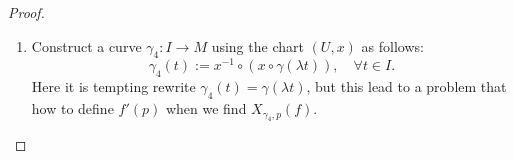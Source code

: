 \begin{proof}
\begin{enumerate}
		      Now, for all \(f \in \SC^\infty(M)\),
		      \begin{align*}
			      X_{\gamma_3, p}(f) & = (f \circ \gamma_3)'(0)                                                                                                                  \\
			                         & = \qty(f \circ x^{-1} \circ (x \circ \gamma_1 + x \circ \gamma_2 - x(p)))'(0)                                                             \\
			      \intertext{map \(f \circ x^{-1}: x(U) \subseteq \R^d \to \R\), and \(x \circ \gamma_1 + x \circ \gamma_2 - x(p): I \subseteq \R \to \R^d\), so we can apply the multivariate chain rule, taking derivative in \(j\)-th coordinate direction, \(j = 1, \ldots, d\):}
			                         & = \qty[\partial_j (f \circ x^{-1})(x(p))] \cdot \qty(x^j \circ \gamma_1 + x^j \circ \gamma_2 - x^j(p))'(0)                                \\
			      \shortintertext{where \(x^j\) is the \(j\)-th coordinate function of chart \(x\). Here sum over \(j\) from \(1\) to \(d\) is implied. Using linearity of the usual derivative, we have:}
			                         & = \qty[\partial_j (f \circ x^{-1})(x(p))] \cdot \qty((x^j \circ \gamma_1)'(0) + (x^j \circ \gamma_2)'(0))                                 \\
			                         & = [\partial_j (f \circ x^{-1})(x(p)) \cdot (x^j \circ \gamma_1)'(0)] + [\partial_j (f \circ x^{-1})(x(p)) \cdot (x^j \circ \gamma_2)'(0)] \\
			      \shortintertext{combining the term in the square brackets, we get:}
			                         & = (f \circ \gamma_1)'(0) + (f \circ \gamma_2)'(0)                                                                                         \\
			                         & = X_{\gamma_1, p}(f) + X_{\gamma_2, p}(f)                                                                                                 \\
			                         & = (X_{\gamma_1, p} \oplus X_{\gamma_2, p})(f).
		      \end{align*}
		      Since this is true for all \(f \in \SC^\infty(M)\), we have
		      \begin{equation}
			      X_{\gamma_3, p} = X_{\gamma_1, p} \oplus X_{\gamma_2, p}.
		      \end{equation}

		\item Construct a curve \(\gamma_4: I \to M\) using the chart \((U, x)\) as follows:
		      \begin{equation}
			      \gamma_4(t) := x^{-1} \circ (x \circ \gamma(\lambda t)) , \quad \forall t \in I.
		      \end{equation}
		      Here it is tempting rewrite \(\gamma_4(t) = \gamma(\lambda t)\), but this lead to a problem that how to define \(f'(p)\) when we find \(X_{\gamma_4, p}(f)\).


\end{enumerate}
\end{proof}
